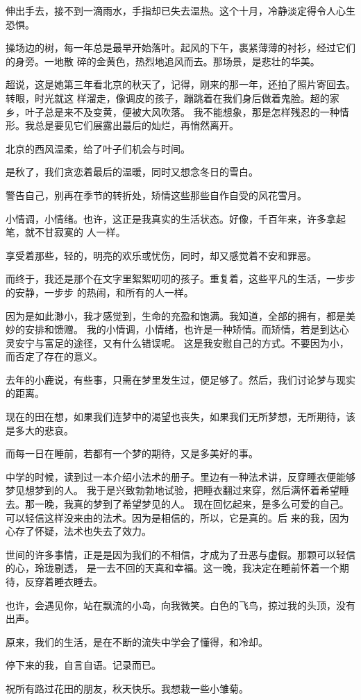 		伸出手去，接不到一滴雨水，手指却已失去温热。这个十月，冷静淡定得令人心生恐惧。

		操场边的树，每一年总是最早开始落叶。起风的下午，裹紧薄薄的衬衫，经过它们的身旁。一地散
	碎的金黄色，热烈地追风而去。那场景，是悲壮的华美。

		超说，这是她第三年看北京的秋天了，记得，刚来的那一年，还拍了照片寄回去。转眼，时光就这
	样溜走，像调皮的孩子，蹦跳着在我们身后做着鬼脸。超的家乡，叶子总是来不及变黄，便被大风吹落。
	我不能想象，那是怎样残忍的一种情形。我总是要见它们展露出最后的灿烂，再悄然离开。

		北京的西风温柔，给了叶子们机会与时间。\par
		是秋了，我们贪恋着最后的温暖，同时又想念冬日的雪白。\par
		警告自己，别再在季节的转折处，矫情这些那些自作自受的风花雪月。

		小情调，小情绪。也许，这正是我真实的生活状态。好像，千百年来，许多拿起笔，就不甘寂寞的
	人一样。

		享受着那些，轻的，明亮的欢乐或忧伤，同时，却又感觉着不安和罪恶。

		而终于，我还是那个在文字里絮絮叨叨的孩子。重复着，这些平凡的生活，一步步的安静，一步步
	的热闹，和所有的人一样。

		因为是如此渺小，我才感觉到，生命的充盈和饱满。我知道，全部的拥有，都是美妙的安排和馈赠。
	我的小情调，小情绪，也许是一种矫情。而矫情，若是到达心灵安宁与富足的途径，又有什么错误呢。
	这是我安慰自己的方式。不要因为小，而否定了存在的意义。

		去年的小鹿说，有些事，只需在梦里发生过，便足够了。然后，我们讨论梦与现实的距离。\par
		现在的田在想，如果我们连梦中的渴望也丧失，如果我们无所梦想，无所期待，该是多大的悲哀。\par
		而每一日在睡前，若都有一个梦的期待，又是多美好的事。

		中学的时候，读到过一本介绍小法术的册子。里边有一种法术讲，反穿睡衣便能够梦见想梦到的人。
	我于是兴致勃勃地试验，把睡衣翻过来穿，然后满怀着希望睡去。那一晚，我真的梦到了希望梦见的人。
	现在回忆起来，是多么可爱的自己。可以轻信这样没来由的法术。因为是相信的，所以，它是真的。后
	来的我，因为心存了怀疑，法术也失去了效力。

		世间的许多事情，正是是因为我们的不相信，才成为了丑恶与虚假。那颗可以轻信的心，玲珑剔透，
	是一去不回的天真和幸福。这一晚，我决定在睡前怀着一个期待，反穿着睡衣睡去。

		也许，会遇见你，站在飘流的小岛，向我微笑。白色的飞鸟，掠过我的头顶，没有出声。\par
		原来，我们的生活，是在不断的流失中学会了懂得，和冷却。\par
		停下来的我，自言自语。记录而已。\par
		祝所有路过花田的朋友，秋天快乐。我想栽一些小雏菊。

